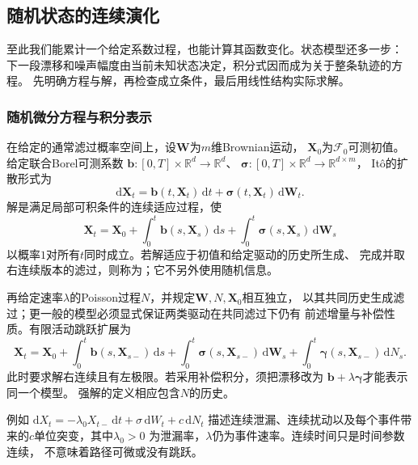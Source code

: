 \subsection{随机状态的连续演化}

至此我们能累计一个给定系数过程，也能计算其函数变化。状态模型还多一步：
下一段漂移和噪声幅度由当前未知状态决定，积分式因而成为关于整条轨迹的方程。
先明确方程与解，再检查成立条件，最后用线性结构实际求解。

\subsubsection{随机微分方程与积分表示}

\begin{definition}[Itô随机微分方程与强解]
  \label{def:dynamical-ito-sde-strong-solution}
  在给定的通常滤过概率空间上，设$\bm W$为$m$维Brownian运动，
  $\bm X_0$为$\mathcal F_0$可测初值。给定联合Borel可测系数
  $\bm b:[0,T]\times\mathbb R^d\to\mathbb R^d$、
  $\bm\sigma:[0,T]\times\mathbb R^d\to\mathbb R^{d\times m}$，
  Itô的扩散形式为
  \begin{equation}
    \mathrm d\bm X_t=\bm b(t,\bm X_t)\,\mathrm dt
                  +\bm\sigma(t,\bm X_t)\,\mathrm d\bm W_t.
    \label{eq:dynamical-ito-sde}
  \end{equation}
  解是满足局部可积条件的连续适应过程，使
  \[
    \bm X_t=\bm X_0+\int_0^t\bm b(s,\bm X_s)\,\mathrm ds
                  +\int_0^t\bm\sigma(s,\bm X_s)\,\mathrm d\bm W_s
  \]
  以概率$1$对所有$t$同时成立。若解适应于初值和给定驱动的历史所生成、
  完成并取右连续版本的滤过，则称为；它不另外使用随机信息。
\end{definition}

再给定速率$\lambda$的Poisson过程$N$，并规定$\bm W,N,\bm X_0$相互独立，
以其共同历史生成滤过；更一般的模型必须显式保证两类驱动在共同滤过下仍有
前述增量与补偿性质。有限活动跳跃扩展为
\begin{equation}
 \bm X_t=\bm X_0+\int_0^t\bm b(s,\bm X_{s-})\,\mathrm ds
      +\int_0^t\bm\sigma(s,\bm X_{s-})\,\mathrm d\bm W_s
      +\int_0^t\bm\gamma(s,\bm X_{s-})\,\mathrm dN_s.
 \label{eq:action-state-jump-sde}
\end{equation}
此时要求解右连续且有左极限。若采用补偿积分，须把漂移改为
$\bm b+\lambda\bm\gamma$才能表示同一个模型。
强解的定义相应包含$N$的历史。

例如
$\mathrm dX_t=-\lambda_0X_{t-}\,\mathrm dt+\sigma\,\mathrm dW_t
                         +c\,\mathrm dN_t$
描述连续泄漏、连续扰动以及每个事件带来的$c$单位突变，其中$\lambda_0>0$
为泄漏率，$\lambda$仍为事件速率。连续时间只是时间参数连续，
不意味着路径可微或没有跳跃。

